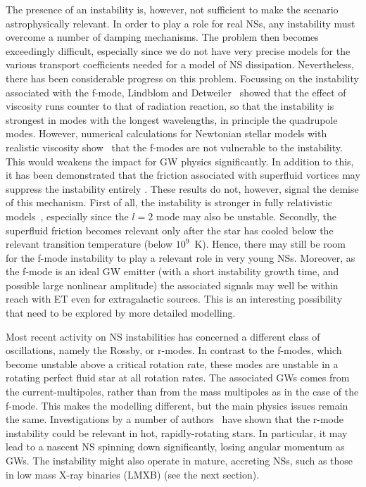 The presence of an instability is, however, not sufficient to make 
the scenario astrophysically relevant. In order to play a role for 
real NSs, any instability must overcome a number of damping mechanisms. 
The problem then becomes exceedingly difficult, especially since we 
do not have very precise models for the various transport coefficients 
needed for a model of NS dissipation. Nevertheless, there has been 
considerable progress on this problem. Focussing on the instability 
associated with the f-mode, Lindblom and Detweiler~\cite{LINDBLOM1977} 
showed that the effect of viscosity runs counter to that of radiation 
reaction, so that the instability is strongest in modes with the 
longest wavelengths,  in principle the quadrupole modes. However, 
numerical calculations for Newtonian stellar models with realistic 
viscosity show~\cite{Lindblom:1995zs} that the f-modes are not vulnerable 
to the instability. This would weakens the impact for GW physics 
significantly. In addition to this, it has been demonstrated that the 
friction associated with superfluid vortices may suppress the 
instability entirely \cite{Lindblom:1995zs}.
These results do not, however, signal the demise of this mechanism. 
First of all, the instability is stronger in fully relativistic 
models~\cite{Stergioulas:1997ja}, especially since the $l=2$ mode 
may also be unstable.  Secondly, the superfluid friction becomes 
relevant only after the star has cooled below the relevant transition 
temperature (below $10^9$~K). Hence, there may still be room for the 
f-mode instability to play a relevant role in very young NSs. Moreover, 
as the f-mode is an ideal GW emitter (with a short instability growth 
time, and possible large nonlinear amplitude) the associated signals 
may well be within reach with ET even for extragalactic sources. This 
is an interesting possibility that need to be explored by more detailed 
modelling. 

Most recent activity on NS instabilities has concerned a different 
class of oscillations, namely the Rossby, or r-modes. In contrast 
to the f-modes, which become unstable above a critical rotation rate, 
these modes are unstable in a rotating perfect fluid star at all 
rotation rates. The associated GWs comes from the current-multipoles, 
rather than from the mass multipoles as in the case of the f-mode. 
This makes the modelling different, but the main physics issues 
remain the same. Investigations by a number of authors~\cite{Lindblom:1998wf, 
Andersson1999, Owen1999} have shown that the r-mode instability could 
be relevant in hot, rapidly-rotating stars.  In particular, it may 
lead to a nascent NS spinning down significantly, losing angular 
momentum as GWs.  The instability might also operate in mature, 
accreting NSs, such as those in low mass X-ray binaries (LMXB) 
(see the next section). 


